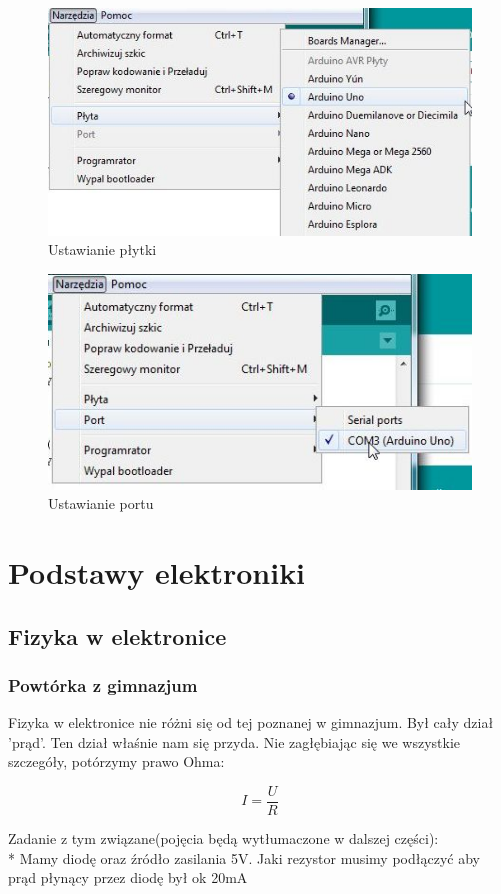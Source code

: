 \begin{figure} %
  \includegraphics[scale=0.7]{arduino-ustawPlytke.jpg}
  \caption{Ustawianie płytki}
  \label{fig:test}
	\end{figure}
	\begin{figure}
  \includegraphics[scale=0.7]{arduino-ustawPort.jpg}
  \caption{Ustawianie portu}
  \label{fig:test}
\end{figure}


\section{Podstawy elektroniki}
 \subsection{Fizyka w elektronice}
	\subsubsection{Powtórka z gimnazjum}
	Fizyka w elektronice nie różni się od tej poznanej w gimnazjum. Był cały dział 'prąd'. Ten dział właśnie nam się przyda. Nie zagłębiając się we wszystkie szczegóły, potórzymy prawo Ohma:
	\begin{center}
	\[
	I=\frac{U}{R}
	\]	
	\end{center}
Zadanie z tym związane(pojęcia będą wytłumaczone w dalszej części): \\* Mamy diodę oraz źródło zasilania 5V. Jaki rezystor musimy podłączyć aby prąd płynący przez diodę był ok 20mA %
